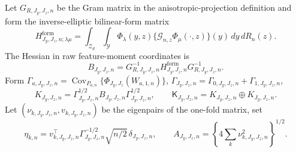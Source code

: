 Let \(G_{R,J_y,J_z,n}\) be the Gram matrix in the anisotropic-projection definition and form the inverse-elliptic bilinear-form matrix
\[
H^{\mathrm{form}}_{J_y,J_z,n;\lambda\mu}
=\int_{\mathcal Z_d}\int_{\mathcal Y}\Phi_\lambda(y,z)
\{\mathcal G_{n,z}\Phi_\mu(\cdot,z)\}(y)\,dy\,dR_n(z).
\]
The Hessian in raw feature-moment coordinates is
\[
B_{J_y,J_z,n}=G_{R,J_y,J_z,n}^{-1}H^{\mathrm{form}}_{J_y,J_z,n}G_{R,J_y,J_z,n}^{-1}.
\]
Form \(\Gamma_{a,J_y,J_z,n}=\operatorname{Cov}_{P_{a,n}}\{\Phi_{J_y,J_z}(W_{a,1,n})\}\), \(\Gamma_{J_y,J_z,n}=\Gamma_{0,J_y,J_z,n}+\Gamma_{1,J_y,J_z,n}\),
\[
K_{J_y,J_z,n}=\Gamma_{J_y,J_z,n}^{1/2}B_{J_y,J_z,n}\Gamma_{J_y,J_z,n}^{1/2},
\qquad
\mathsf K_{J_y,J_z,n}=K_{J_y,J_z,n}\oplus K_{J_y,J_z,n}.
\]
Let \((\nu_{k,J_y,J_z,n},v_{k,J_y,J_z,n})\) be the eigenpairs of the one-fold matrix, set
\[
\eta_{k,n}=v_{k,J_y,J_z,n}^{\top}\Gamma_{J_y,J_z,n}^{-1/2}\sqrt{n/2}\,\delta_{J_y,J_z,n},
\qquad
A_{J_y,J_z,n}=\left\{4\sum_k\nu_{k,J_y,J_z,n}^2\right\}^{1/2}.
\]
